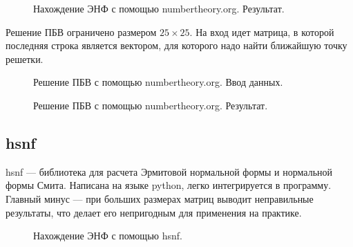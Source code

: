 \begin{figure}[H]
\caption{Нахождение ЭНФ с помощью numbertheory.org. Результат.}
\label{fig:HNF_NT_RESULT}
\end{figure}

Решение ПБВ ограничено размером $ 25 \times 25 $. На вход идет матрица, в которой последняя строка является вектором, для которого надо найти ближайшую точку решетки. 

\begin{figure}[H]
\caption{Решение ПБВ с помощью numbertheory.org. Ввод данных.}
\label{fig:CVP_NT_INPUT}
\end{figure}

\begin{figure}[H]
\caption{Решение ПБВ с помощью numbertheory.org. Результат.}
\label{fig:HNF_NT_RESULT}
\end{figure}

\subsection{hsnf}

hsnf --- библиотека для расчета Эрмитовой нормальной формы и нормальной формы Смита. Написана на языке python, легко интегрируется в программу. Главный минус --- при больших размерах матриц выводит неправильные результаты, что делает его непригодным для применения на практике.

\begin{figure}[H]
\caption{Нахождение ЭНФ с помощью hsnf.}
\label{fig:HNF_NT_RESULT}
\end{figure}


\clearpage